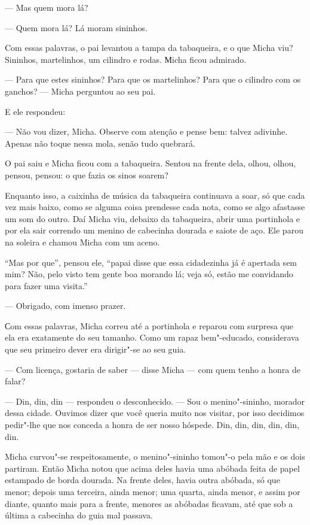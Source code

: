 --- Mas quem mora lá?

--- Quem mora lá? Lá moram sininhos.

Com essas palavras, o pai levantou a tampa da tabaqueira, e o que Micha
viu? Sininhos, martelinhos, um cilindro e rodas. Мicha ficou admirado.

--- Para que estes sininhos? Para que os martelinhos? Para que o
cilindro com os ganchos? --- Micha perguntou ao seu pai.

E ele respondeu:

--- Não vou dizer, Micha. Observe com atenção e pense bem: talvez
adivinhe. Apenas não toque nessa mola, senão tudo quebrará.

O pai saiu e Micha ficou com a tabaqueira. Sentou na frente dela, olhou,
olhou, pensou, pensou: o que fazia os sinos soarem?

Enquanto isso, a caixinha de música da tabaqueira continuava a soar, só
que cada vez mais baixo, como se alguma coisa prendesse cada nota, como
se algo afastasse um som do outro. Daí Micha viu, debaixo da tabaqueira,
abrir uma portinhola e por ela sair correndo um menino de cabecinha
dourada e saiote de aço. Ele parou na soleira e chamou Micha com um
aceno.

``Mas por que'', pensou ele, ``papai disse que essa cidadezinha já é
apertada sem mim? Não, pelo visto tem gente boa morando lá; veja só,
estão me convidando para fazer uma visita.''

--- Obrigado, com imenso prazer.

Сom essas palavras, Micha correu até a portinhola e reparou com surpresa
que ela era exatamente do seu tamanho. Como um rapaz bem"-educado,
considerava que seu primeiro dever era dirigir"-se ao seu guia.

--- Com licença, gostaria de saber --- disse Micha --- com quem tenho a
honra de falar?

--- Din, din, din --- respondeu o desconhecido. --- Sou o
menino"-sininho, morador dessa cidade. Ouvimos dizer que você queria
muito nos visitar, por isso decidimos pedir"-lhe que nos conceda a honra
de ser nosso hóspede. Din, din, din, din, din, din.

Micha curvou"-se respeitosamente, o menino"-sininho tomou"-o pela mão e os
dois partiram. Então Micha notou que acima deles havia uma abóbada feita
de papel estampado de borda dourada. Na frente deles, havia outra
abóbada, só que menor; depois uma terceira, ainda menor; uma quarta,
ainda menor, e assim por diante, quanto mais para a frente, menores as
abóbadas ficavam, até que sob a última a cabecinha do guia mal passava.

